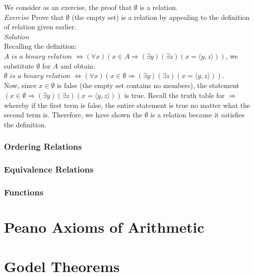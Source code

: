We consider as an exercise, the proof that $\emptyset$ is a relation.\\

\textit{Exercise} Prove that $\emptyset$ (the empty set) is a relation by appealing to the definition of relation given earlier.\\
\textit{Solution}\\
Recalling the definition: $A \textit{ is a binary relation } \Longleftrightarrow (\forall x) (x \in A \Longrightarrow (\exists y)(\exists z)(x=\langle y,z \rangle))$, we substitute $\emptyset$ for $A$ and obtain:\\

$\emptyset \textit{ is a binary relation } \Longleftrightarrow (\forall x) (x \in \emptyset \Longrightarrow (\exists y)(\exists z)(x=\langle y,z \rangle))$.\\

Now, since $x \in \emptyset$ is false (the empty set contains no members), the statement $(x \in \emptyset \Longrightarrow (\exists y)(\exists z)(x=\langle y,z \rangle))$ is true.  Recall the truth table for $\Longrightarrow$ whereby if the first term is false, the entire statement is true no matter what the second term is.  Therefore, we have shown the $\emptyset$ is a relation because it satisfies the definition.\\

\subsubsection{Ordering Relations}

\subsubsection{Equivalence Relations}

\subsubsection{Functions}


\section{Peano Axioms of Arithmetic}

\section{Godel Theorems}